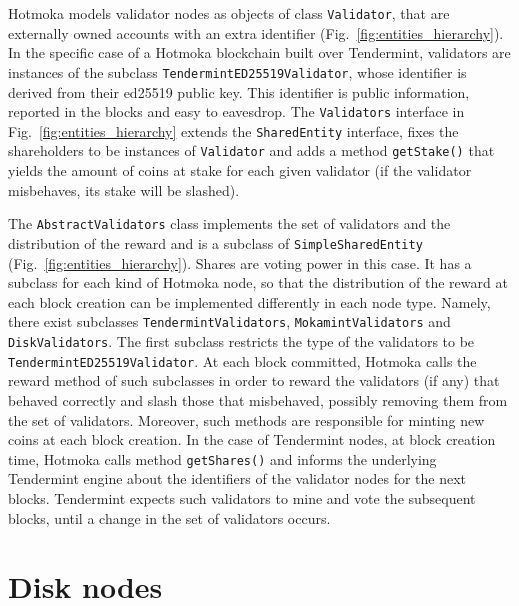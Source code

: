 Hotmoka models validator nodes as
objects of class \texttt{Validator},
that are externally owned accounts with an extra identifier
(Fig.~\ref{fig:entities_hierarchy}).
In the specific case of a Hotmoka blockchain built over Tendermint, validators
are instances of the subclass
\texttt{TendermintED25519Validator},
whose identifier is derived from their
ed25519 public key. This identifier is public information, reported
in the blocks and easy to eavesdrop.
The \texttt{Validators}
interface in Fig.~\ref{fig:entities_hierarchy}
extends the \texttt{SharedEntity} interface, fixes the shareholders
to be instances of \texttt{Validator} and adds a method
\texttt{getStake()} that yields the amount of coins
at stake for each given validator (if the validator misbehaves, its stake will be slashed).

The \texttt{AbstractValidators}
class implements the set of validators and the distribution
of the reward and is a subclass of \texttt{SimpleSharedEntity} (Fig.~\ref{fig:entities_hierarchy}).
Shares are voting power in this case. It has a subclass
for each kind of Hotmoka node, so that the distribution of the reward at each
block creation can be implemented differently in each node type.
Namely, there exist subclasses
\texttt{TendermintValidators},
\texttt{MokamintValidators} and
\texttt{DiskValidators}.
The first subclass restricts the type of the validators to be
\texttt{TendermintED25519Validator}. At each
block committed, Hotmoka calls the reward method of such subclasses in order
to reward the validators (if any) that behaved correctly and slash those that
misbehaved, possibly removing them from the set of validators. Moreover, such methods
are responsible for minting new coins at each block creation.
In the case of Tendermint nodes, at block creation time,
Hotmoka calls method \texttt{getShares()} and informs
the underlying Tendermint engine about the identifiers of the validator nodes
for the next blocks. Tendermint expects such validators to mine and vote the
subsequent blocks, until a change in the set of validators occurs.

\section{Disk nodes}\label{sec:disk_nodes}

